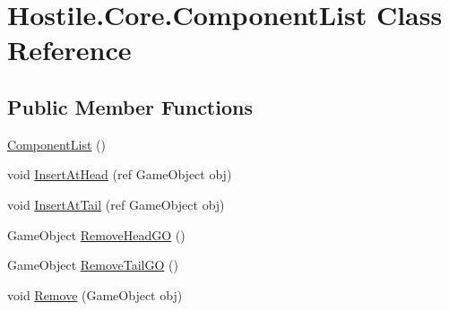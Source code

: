 \hypertarget{class_hostile_1_1_core_1_1_component_list}{\section{Hostile.\-Core.\-Component\-List Class Reference}
\label{class_hostile_1_1_core_1_1_component_list}
}
\subsection*{Public Member Functions}
\begin{DoxyCompactItemize}
\item 
\hyperlink{class_hostile_1_1_core_1_1_component_list_ad8baaef1bd23db8f870a6f63a74fcdba}{Component\-List} ()
\item 
void \hyperlink{class_hostile_1_1_core_1_1_component_list_a3b5457925bec2700545cd03382f9ff09}{Insert\-At\-Head} (ref Game\-Object obj)
\item 
void \hyperlink{class_hostile_1_1_core_1_1_component_list_a33c21d584e461d1302dee66b58b26714}{Insert\-At\-Tail} (ref Game\-Object obj)
\item 
Game\-Object \hyperlink{class_hostile_1_1_core_1_1_component_list_a0d4f29a0d2b8056b857685ffa77c8f61}{Remove\-Head\-G\-O} ()
\item 
Game\-Object \hyperlink{class_hostile_1_1_core_1_1_component_list_a44274c8d99a24d0505bce9ba7d2c4b1e}{Remove\-Tail\-G\-O} ()
\item 
void \hyperlink{class_hostile_1_1_core_1_1_component_list_a7f8d809541740981502154823c9ce1f0}{Remove} (Game\-Object obj)
\end{DoxyCompactItemize}

